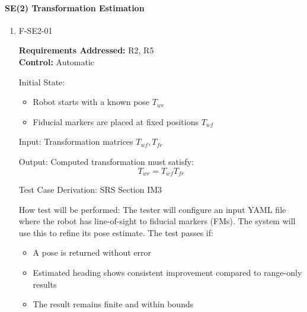 \documentclass[12pt, titlepage]{article}
\begin{document}
\paragraph{SE(2) Transformation Estimation}
\begin{enumerate}					
\item{F-SE2-01}

\textbf{Requirements Addressed:} R2, R5\\
\textbf{Control:} Automatic
					
Initial State: 
\begin{itemize}
  \item Robot starts with a known pose $T_{wr}$
  \item Fiducial markers are placed at fixed positions $T_{wf}$
\end{itemize}
					
Input: Transformation matrices $T_{wf}, T_{fr}$ 

Output: Computed transformation must satisfy:
\[
T_{wr} = T_{wf} T_{fr}
\]

Test Case Derivation: SRS Section IM3

How test will be performed: The tester will configure an input YAML file where the robot has line-of-sight to fiducial markers (FMs). The system will use this to refine its pose estimate. The test passes if:
\begin{itemize}
  \item A pose is returned without error
  \item Estimated heading shows consistent improvement compared to range-only results
  \item The result remains finite and within bounds
\end{itemize}
\end{enumerate}
\end{document}
